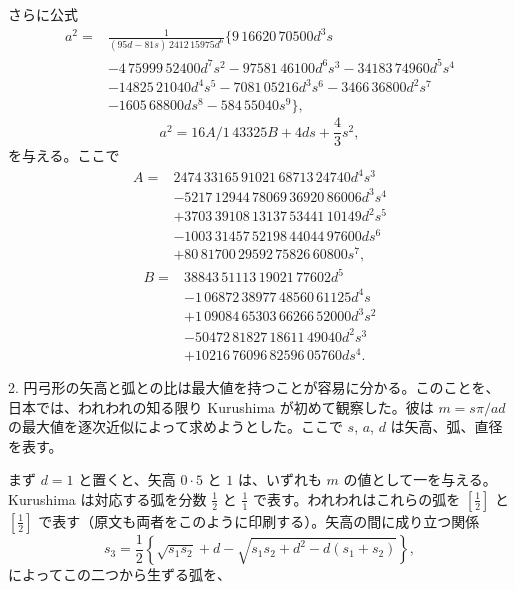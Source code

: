 \documentclass[11pt]{article}
\newcommand{\scanfooter}{}
\newcommand{\dd}{\mathbin{\cdot}}
\begin{document}
さらに公式
\[
\begin{aligned}
a^2={}&\frac1{(95d-81s)\,2412\,15975d^6}\{9\,16620\,70500d^3s\\
&-4\,75999\,52400d^7s^2-97581\,46100d^6s^3-34183\,74960d^5s^4\\
&-14825\,21040d^4s^5-7081\,05216d^3s^6-3466\,36800d^2s^7\\
&-1605\,68800ds^8-584\,55040s^9\},
\end{aligned}
\]
\[
a^2=16A/1\,43325B+4ds+\frac43s^2,
\]
を与える。ここで
\[
\begin{aligned}
A={}&2474\,33165\,91021\,68713\,24740d^4s^3\\
&-5217\,12944\,78069\,36920\,86006d^3s^4\\
&+3703\,39108\,13137\,53441\,10149d^2s^5\\
&-1003\,31457\,52198\,44044\,97600ds^6\\
&+80\,81700\,29592\,75826\,60800s^7,
\end{aligned}
\]
\[
\begin{aligned}
B={}&38843\,51113\,19021\,77602d^5\\
&-1\,06872\,38977\,48560\,61125d^4s\\
&+1\,09084\,65303\,66266\,52000d^3s^2\\
&-50472\,81827\,18611\,49040d^2s^3\\
&+10216\,76096\,82596\,05760ds^4.
\end{aligned}
\]

2. 円弓形の矢高と弧との比は最大値を持つことが容易に分かる。このことを、日本では、われわれの知る限り Kurushima が初めて観察した。彼は $m=s\pi/ad$ の最大値を逐次近似によって求めようとした。ここで $s$, $a$, $d$ は矢高、弧、直径を表す。

まず $d=1$ と置くと、矢高 $0\dd5$ と $1$ は、いずれも $m$ の値として一を与える。Kurushima は対応する弧を分数 $\frac12$ と $\frac11$ で表す。われわれはこれらの弧を $\left[\frac12\right]$ と $\left[\frac12\right]$ で表す（原文も両者をこのように印刷する）。矢高の間に成り立つ関係
\[
s_3=\frac12\left\{\sqrt{s_1s_2}+d-\sqrt{s_1s_2+d^2-d(s_1+s_2)}\right\},
\]
によってこの二つから生ずる弧を、
\scanfooter
\end{document}
